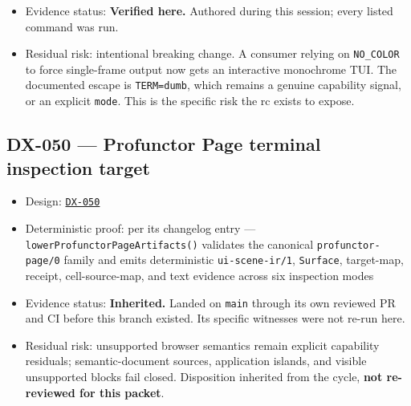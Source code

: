 \begin{itemize}
\item
  Evidence status: \textbf{Verified here.} Authored during this session; every listed command was run.
\item
  Residual risk: intentional breaking change. A consumer relying on \texttt{N\allowbreak{}O\allowbreak{}\_\allowbreak{}C\allowbreak{}O\allowbreak{}L\allowbreak{}O\allowbreak{}R} to force single-frame output now gets an interactive monochrome TUI. The documented escape is \texttt{T\allowbreak{}E\allowbreak{}R\allowbreak{}M\allowbreak{}=\allowbreak{}d\allowbreak{}u\allowbreak{}m\allowbreak{}b}, which remains a genuine capability signal, or an explicit \texttt{m\allowbreak{}o\allowbreak{}d\allowbreak{}e}. This is the specific risk the rc exists to expose.
\end{itemize}

\subsection{DX-050 --- Profunctor Page terminal inspection target}\label{record-262-dx-050-profunctor-page-terminal-inspection-target}

\begin{itemize}
\tightlist
\item
  Design: \href{https://github.com/flyingrobots/bijou/blob/cbd70612140e7a450d764b3c7be1c6af878b99bc/docs/design/DX-050-profunctor-page-inspection.md}{\texttt{D\allowbreak{}X\allowbreak{}-\allowbreak{}0\allowbreak{}5\allowbreak{}0}}
\item
  Deterministic proof: per its changelog entry --- \texttt{l\allowbreak{}o\allowbreak{}w\allowbreak{}e\allowbreak{}r\allowbreak{}P\allowbreak{}r\allowbreak{}o\allowbreak{}f\allowbreak{}u\allowbreak{}n\allowbreak{}c\allowbreak{}t\allowbreak{}o\allowbreak{}r\allowbreak{}P\allowbreak{}a\allowbreak{}g\allowbreak{}e\allowbreak{}A\allowbreak{}r\allowbreak{}t\allowbreak{}i\allowbreak{}f\allowbreak{}a\allowbreak{}c\allowbreak{}t\allowbreak{}s\allowbreak{}(\allowbreak{})} validates the canonical \texttt{p\allowbreak{}r\allowbreak{}o\allowbreak{}f\allowbreak{}u\allowbreak{}n\allowbreak{}c\allowbreak{}t\allowbreak{}o\allowbreak{}r\allowbreak{}-\allowbreak{}p\allowbreak{}a\allowbreak{}g\allowbreak{}e\allowbreak{}/\allowbreak{}0} family and emits deterministic \texttt{u\allowbreak{}i\allowbreak{}-\allowbreak{}s\allowbreak{}c\allowbreak{}e\allowbreak{}n\allowbreak{}e\allowbreak{}-\allowbreak{}i\allowbreak{}r\allowbreak{}/\allowbreak{}1}, \texttt{S\allowbreak{}u\allowbreak{}r\allowbreak{}f\allowbreak{}a\allowbreak{}c\allowbreak{}e}, target-map, receipt, cell-source-map, and text evidence across six inspection modes
\item
  Evidence status: \textbf{Inherited.} Landed on \texttt{m\allowbreak{}a\allowbreak{}i\allowbreak{}n} through its own reviewed PR and CI before this branch existed. Its specific witnesses were not re-run here.
\item
  Residual risk: unsupported browser semantics remain explicit capability residuals; semantic-document sources, application islands, and visible unsupported blocks fail closed. Disposition inherited from the cycle, \textbf{not re-reviewed for this packet}.
\end{itemize}

